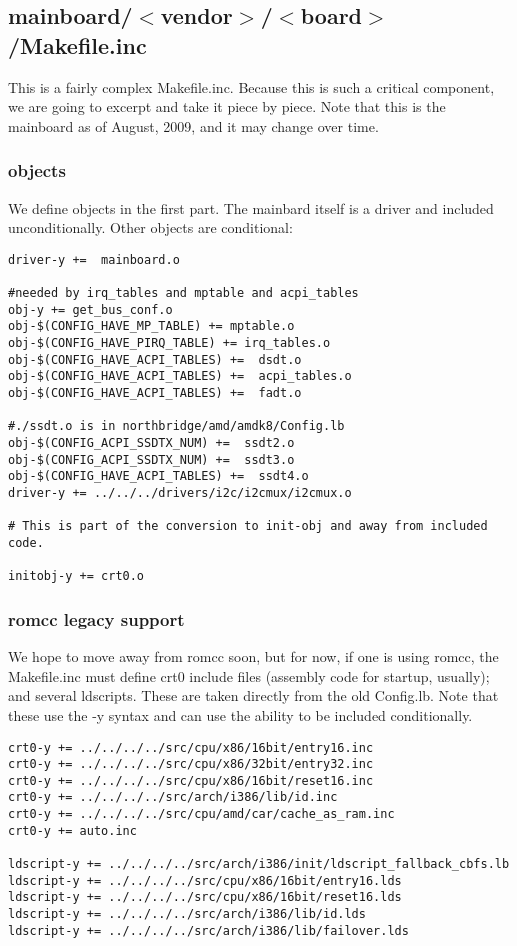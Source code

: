 \documentclass[10pt,letterpaper]{article}
\begin{document}
\subsection{mainboard/$<$vendor$>$/$<$board$>$/Makefile.inc}
This is a fairly complex Makefile.inc. Because this is such a critical component, we are going to excerpt and take it piece by piece.
Note that this is the mainboard as of August, 2009, and it may change over time.
\subsubsection{objects}
We define objects in the first part. The mainbard itself is a driver and included unconditionally. Other objects are conditional:
\begin{verbatim}
driver-y +=  mainboard.o

#needed by irq_tables and mptable and acpi_tables
obj-y += get_bus_conf.o
obj-$(CONFIG_HAVE_MP_TABLE) += mptable.o
obj-$(CONFIG_HAVE_PIRQ_TABLE) += irq_tables.o
obj-$(CONFIG_HAVE_ACPI_TABLES) +=  dsdt.o
obj-$(CONFIG_HAVE_ACPI_TABLES) +=  acpi_tables.o
obj-$(CONFIG_HAVE_ACPI_TABLES) +=  fadt.o

#./ssdt.o is in northbridge/amd/amdk8/Config.lb
obj-$(CONFIG_ACPI_SSDTX_NUM) +=  ssdt2.o
obj-$(CONFIG_ACPI_SSDTX_NUM) +=  ssdt3.o
obj-$(CONFIG_HAVE_ACPI_TABLES) +=  ssdt4.o
driver-y += ../../../drivers/i2c/i2cmux/i2cmux.o

# This is part of the conversion to init-obj and away from included code.

initobj-y += crt0.o
\end{verbatim}
\subsubsection{romcc legacy support}
We hope to move away from romcc soon, but for now, if one is using romcc, the Makefile.inc must define
crt0 include files (assembly code for startup, usually); and several ldscripts. These are taken directly from the
old Config.lb. Note that these use the -y syntax and can use the ability to be included conditionally.
\begin{verbatim}
crt0-y += ../../../../src/cpu/x86/16bit/entry16.inc
crt0-y += ../../../../src/cpu/x86/32bit/entry32.inc
crt0-y += ../../../../src/cpu/x86/16bit/reset16.inc
crt0-y += ../../../../src/arch/i386/lib/id.inc
crt0-y += ../../../../src/cpu/amd/car/cache_as_ram.inc
crt0-y += auto.inc

ldscript-y += ../../../../src/arch/i386/init/ldscript_fallback_cbfs.lb
ldscript-y += ../../../../src/cpu/x86/16bit/entry16.lds
ldscript-y += ../../../../src/cpu/x86/16bit/reset16.lds
ldscript-y += ../../../../src/arch/i386/lib/id.lds
ldscript-y += ../../../../src/arch/i386/lib/failover.lds

\end{verbatim}
\end{document}
